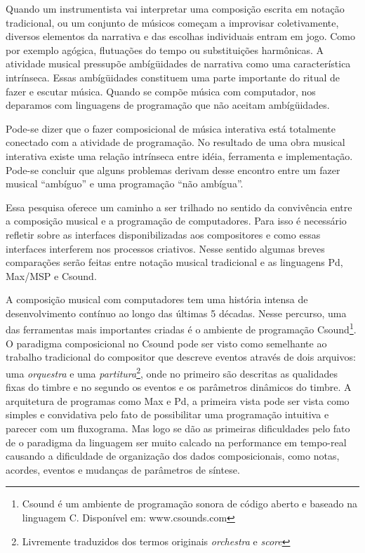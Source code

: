 \documentclass{ppgmus}
\begin{document}
Quando um instrumentista
vai interpretar uma composição escrita em notação tradicional, ou um conjunto de 
músicos começam a improvisar coletivamente, diversos elementos da narrativa e 
das escolhas individuais entram em jogo. Como por exemplo agógica, flutuações do tempo ou
 substituições harmônicas. A atividade musical pressupõe ambígüidades de narrativa como
uma característica intrínseca.
Essas ambígüidades constituem uma parte importante do ritual de fazer
e escutar música. Quando se compõe música com computador, nos
deparamos com linguagens de programação que não aceitam ambígüidades.

Pode-se dizer que o fazer composicional de música interativa está 
totalmente conectado com a atividade de programação. No resultado de uma
obra musical interativa existe uma relação intrínseca entre idéia, ferramenta e 
implementação. Pode-se concluir que alguns 
problemas derivam desse encontro entre um fazer musical ``ambíguo'' e uma programação
``não ambígua''. 


Essa pesquisa oferece um caminho a ser trilhado no sentido da convivência
entre a composição musical e a programação de computadores.
Para isso é necessário refletir sobre as interfaces disponibilizadas
aos compositores e como essas interfaces interferem nos processos criativos.
Nesse sentido algumas breves comparações serão feitas entre notação musical
tradicional e as linguagens Pd, Max/MSP e Csound.

A composição musical com computadores tem uma história intensa de desenvolvimento
contínuo ao longo das últimas 5 décadas. Nesse percurso, uma das ferramentas mais
importantes criadas é o ambiente de programação Csound\footnote{Csound é um ambiente de programação
sonora de código aberto e baseado na linguagem C. Disponível em: www.csounds.com}.
O paradigma composicional no Csound pode ser visto como semelhante ao
trabalho tradicional do compositor que descreve eventos através de
dois arquivos: uma \textit{orquestra} e uma \textit{partitura}\footnote{Livremente traduzidos
dos termos originais \textit{orchestra} e \textit{score}}, onde no primeiro são
descritas as qualidades fixas do timbre e no segundo os eventos e os
parâmetros dinâmicos do timbre. A arquitetura de programas como Max e
Pd, a primeira vista pode ser vista como simples e convidativa pelo
fato de possibilitar uma programação intuitiva e parecer com um
fluxograma. Mas logo se dão as primeiras dificuldades pelo fato de o
paradigma da linguagem ser muito calcado na performance em tempo-real
causando a dificuldade de organização dos dados composicionais, como
notas, acordes, eventos e mudanças de parâmetros de síntese.
\end{document}
